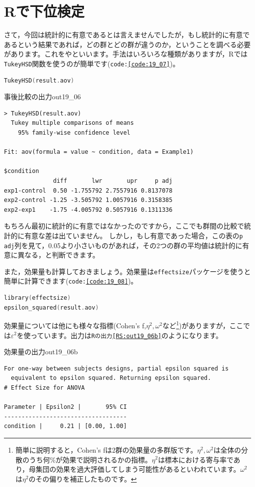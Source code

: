 \documentclass{ltjbook}
\begin{document}
\section{Rで下位検定}

さて，今回は統計的に有意であるとは言えませんでしたが，もし統計的に有意であるという結果であれば，どの群とどの群が違うのか，ということを調べる必要があります。これをやといいます。手法はいろいろな種類がありますが，Rでは\texttt{TukeyHSD}関数を使うのが簡単です(\texttt{code:\ref{code:19_07}})。

\begin{lstlisting}[language=c++,label={code:19_07},caption={事後比較}]
TukeyHSD(result.aov)
\end{lstlisting}

\begin{Rscreen}{事後比較の出力}{out19_06}
\begin{verbatim}
> TukeyHSD(result.aov)
  Tukey multiple comparisons of means
    95% family-wise confidence level

Fit: aov(formula = value ~ condition, data = Example1)

$condition
              diff       lwr       upr     p adj
exp1-control  0.50 -1.755792 2.7557916 0.8137078
exp2-control -1.25 -3.505792 1.0057916 0.3158385
exp2-exp1    -1.75 -4.005792 0.5057916 0.1311336
\end{verbatim}
\end{Rscreen}

もちろん最初に統計的に有意ではなかったのですから，ここでも群間の比較で統計的に有意な差は出ていません。
しかし，もし有意であった場合，この表の\texttt{p adj}列を見て，0.05より小さいものがあれば，その2つの群の平均値は統計的に有意に異なる，と判断できます。

また，効果量も計算しておきましょう。効果量は\texttt{effectsize}パッケージを使うと簡単に計算できます(\texttt{code:\ref{code:19_08}})。

\begin{lstlisting}[language=c++,label={code:19_08},caption={効果量の算出}]
library(effectsize)
epsilon_squared(result.aov)
\end{lstlisting}

効果量については他にも様々な指標(Cohen's f,$\eta^2,\omega^2$など\footnote{簡単に説明すると，Cohen's fは2群の効果量の多群版です。$\eta^2,\omega^2$は全体の分散のうち何\%が効果で説明されるかの指標。$\eta^2$は標本における寄与率であり，母集団の効果を過大評価してしまう可能性があるといわれています。$\omega^2$は$\eta^2$のその偏りを補正したものです。})がありますが，ここでは$\varepsilon^2$を使っています。出力は\texttt{Rの出力\ref{RS:out19_06b}}のようになります。
\begin{Rscreen}{効果量の出力}{out19_06b}
\begin{verbatim}
For one-way between subjects designs, partial epsilon squared is
  equivalent to epsilon squared. Returning epsilon squared.
# Effect Size for ANOVA

Parameter | Epsilon2 |       95% CI
-----------------------------------
condition |     0.21 | [0.00, 1.00]	
\end{verbatim}
\end{Rscreen}
\end{document}
